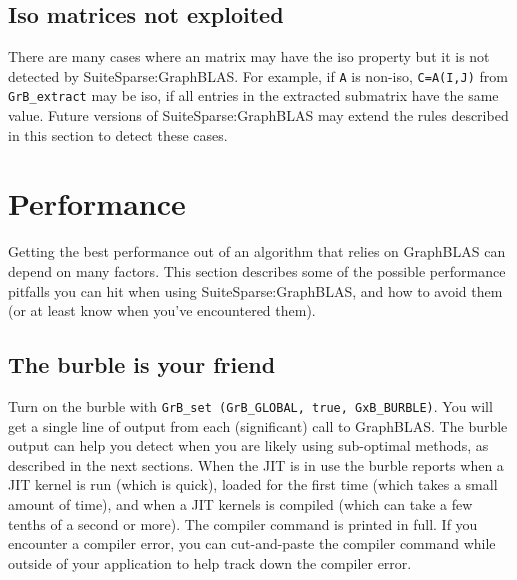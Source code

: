 \documentclass[12pt]{article}
\begin{document}
\subsection{Iso matrices not exploited}

There are many cases where an matrix may have the iso property but it is not
detected by SuiteSparse:GraphBLAS.  For example, if \verb'A' is non-iso,
\verb'C=A(I,J)' from \verb'GrB_extract' may be iso, if all entries in the
extracted submatrix have the same value.  Future versions of
SuiteSparse:GraphBLAS may extend the rules described in this section to detect
these cases.

\newpage
\section{Performance} %
\label{perf}

Getting the best performance out of an algorithm that relies on GraphBLAS can
depend on many factors.  This section describes some of the possible
performance pitfalls you can hit when using SuiteSparse:GraphBLAS, and how to
avoid them (or at least know when you've encountered them).

\subsection{The burble is your friend}

Turn on the burble with \verb'GrB_set (GrB_GLOBAL, true, GxB_BURBLE)'.  You will get a
single line of output from each (significant) call to GraphBLAS.
The burble output can help you detect when you are likely using sub-optimal
methods, as described in the next sections.
When the JIT is in use the burble reports when a JIT kernel is run (which
is quick), loaded for the first time (which takes a small amount of time),
and when a JIT kernels is compiled (which can take a few tenths of a second
or more).  The compiler command is printed in full.  If you encounter a
compiler error, you can cut-and-paste the compiler command while outside
of your application to help track down the compiler error.
\end{document}

